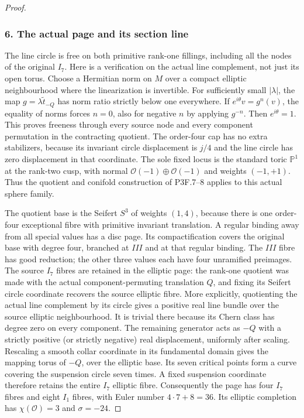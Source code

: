 \begin{proof}
\subsubsection{6. The actual page and its section line}\label{the-actual-page-and-its-section-line}

The line circle is free on both primitive rank-one fillings, including all the nodes of the original \(I_7\). Here is a verification on the actual line complement, not just its open torus. Choose a Hermitian norm on \(M\) over a compact elliptic neighbourhood where the linearization is invertible. For sufficiently small \(|\lambda|\), the map \(g=\lambda\widetilde t_{-Q}\) has norm ratio strictly below one everywhere. If \(e^{i\theta}v=g^n(v)\), the equality of norms forces \(n=0\), also for negative \(n\) by applying \(g^{-n}\). Then \(e^{i\theta}=1\). This proves freeness through every source node and every component permutation in the contracting quotient. The order-four cap has no extra stabilizers, because its invariant circle displacement is \(j/4\) and the line circle has zero displacement in that coordinate. The sole fixed locus is the standard toric \(\mathbb P^1\) at the rank-two cusp, with normal \(\mathcal O(-1)\oplus\mathcal O(-1)\) and weights \((-1,+1)\). Thus the quotient and conifold construction of P3F.7--8 applies to this actual sphere family.

The quotient base is the Seifert \(S^3\) of weights \((1,4)\), because there is one order-four exceptional fibre with primitive invariant translation. A regular binding away from all special values has a disc page. Its compactification covers the original base with degree four, branched at \(III\) and at that regular binding. The \(III\) fibre has good reduction; the other three values each have four unramified preimages. The source \(I_7\) fibres are retained in the elliptic page: the rank-one quotient was made with the actual component-permuting translation \(Q\), and fixing its Seifert circle coordinate recovers the source elliptic fibre. More explicitly, quotienting the actual line complement by its circle gives a positive real line bundle over the source elliptic neighbourhood. It is trivial there because its Chern class has degree zero on every component. The remaining generator acts as \(-Q\) with a strictly positive (or strictly negative) real displacement, uniformly after scaling. Rescaling a smooth collar coordinate in its fundamental domain gives the mapping torus of \(-Q\), over the elliptic base. Its seven critical points form a curve covering the suspension circle seven times. A fixed suspension coordinate therefore retains the entire \(I_7\) elliptic fibre. Consequently the page has four \(I_7\) fibres and eight \(I_1\) fibres, with Euler number \(4\cdot7+8=36\). Its elliptic completion has \(\chi(\mathcal O)=3\) and \(\sigma=-24\).


\end{proof}
